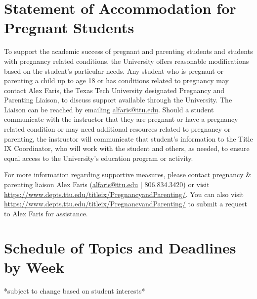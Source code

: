 \documentclass[12pt, notitlepage]{article}   	%
\begin{document}
{\section{Statement of Accommodation for Pregnant Students}
To support the academic success of pregnant and parenting students and students with pregnancy related conditions, the University offers reasonable modifications based on the student’s particular needs. Any student who is pregnant or parenting a child up to age 18 or has conditions related to pregnancy may contact Alex Faris, the Texas Tech University designated Pregnancy and Parenting Liaison, to discuss support available through the University. The Liaison can be reached by emailing \href{mailto:alfaris@ttu.edu}{alfaris@ttu.edu}. Should a student communicate with the instructor that they are pregnant or have a pregnancy related condition or may need additional resources related to pregnancy or parenting, the instructor will communicate that student’s information to the Title IX Coordinator, who will work with the student and others, as needed, to ensure equal access to the University’s education program or activity. 

For more information regarding supportive measures, please contact pregnancy \& parenting liaison Alex Faris (\href{mailto:alfaris@ttu.edu}{alfaris@ttu.edu} | 806.834.3420) or visit \newline \href{https://www.depts.ttu.edu/titleix/PregnancyandParenting/}{https://www.depts.ttu.edu/titleix/PregnancyandParenting/}. You can also visit \newline \href{https://www.depts.ttu.edu/titleix/PregnancyandParenting/}{https://www.depts.ttu.edu/titleix/PregnancyandParenting/} to submit a request to Alex Faris for assistance.


\newpage
\section*{Schedule of Topics and Deadlines by Week}
*subject to change based on student interests* \par

}
\end{document}
